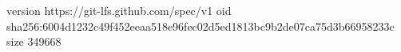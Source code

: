 version https://git-lfs.github.com/spec/v1
oid sha256:6004d1232c49f452eeaa518e96fec02d5ed1813bc9b2de07ca75d3b66958233c
size 349668
